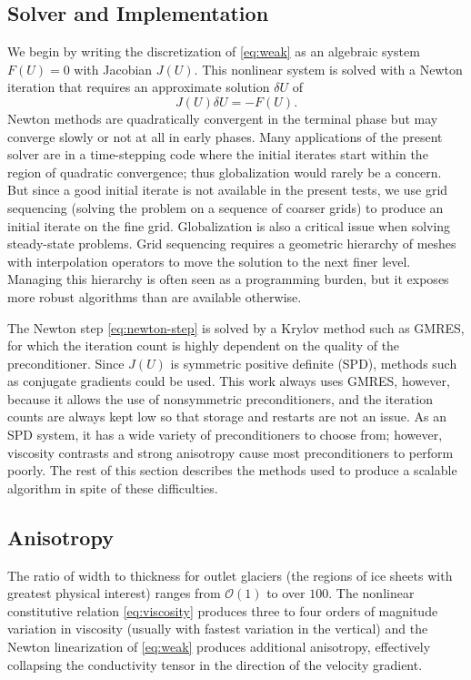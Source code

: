 \documentclass[draft,lineno,jgrga]{AGUTeX}
\newcommand{\bigO}{{\mathcal{O}}}
\begin{document}
\begin{article}
\section{Solver and Implementation}\label{sec:solver}
We begin by writing the discretization of \eqref{eq:weak} as an algebraic system $F(U) = 0$ with
Jacobian $J(U)$.  This nonlinear system is solved with a Newton iteration that requires an
approximate solution $\delta U$ of
\begin{equation}\label{eq:newton-step}
  J(U)\delta U = -F(U) .
\end{equation}
Newton methods are quadratically convergent in the terminal phase but may converge slowly or
not at all in early phases.  Many applications of the present solver are in a time-stepping code
where the initial iterates start within the region of quadratic convergence; thus globalization
would rarely be a concern. But since a good initial iterate is not available in the present tests,
we use grid sequencing (solving the problem on a sequence of coarser grids) to produce an initial
iterate on the fine grid.
Globalization is also a critical issue when solving steady-state problems.
Grid sequencing requires a geometric hierarchy of meshes with interpolation operators to move the solution to the next finer level.
Managing this hierarchy is often seen as a programming burden, but it exposes more robust algorithms than are available otherwise.

The Newton step \eqref{eq:newton-step} is solved by a Krylov method such as GMRES, for which the iteration count is highly dependent on the quality of the preconditioner.  Since $J(U)$ is symmetric positive definite (SPD), methods such as conjugate gradients could be used. This work always uses GMRES, however, because it allows the use of nonsymmetric preconditioners, and the iteration counts are always kept low so that storage and restarts are not an issue.  As an SPD system, it has a wide variety of preconditioners to choose from; however, viscosity contrasts and strong anisotropy cause most preconditioners to perform poorly.  The rest of this section describes the methods used to produce a scalable algorithm in spite of these difficulties.

\subsection{Anisotropy}
The ratio of width to thickness for outlet glaciers (the regions of ice sheets with greatest physical interest) ranges from $\bigO(1)$ to over $100$.  The nonlinear constitutive relation \eqref{eq:viscosity} produces three to four orders of magnitude variation in viscosity (usually with fastest variation in the vertical) and the Newton linearization of \eqref{eq:weak} produces additional anisotropy, effectively collapsing the conductivity tensor in the direction of the velocity gradient.


\end{article}
\end{document}
